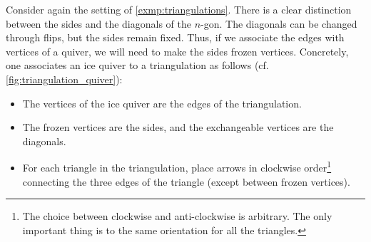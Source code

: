 \begin{example}\label{exmp:triangulations_revisited}

	Consider again the setting of \cref{exmp:triangulations}. There is a clear distinction
	between the sides and the diagonals of the $n$-gon. The diagonals can be changed
	through flips, but the sides remain fixed. Thus, if we associate the edges with
	vertices of a quiver, we will need to make the sides frozen vertices. Concretely, one
	associates an ice quiver to a triangulation as follows (cf.
	\cref{fig:triangulation_quiver}):
	\begin{itemize}
		\item The vertices of the ice quiver are the edges of the triangulation.
		\item The frozen vertices are the sides, and the exchangeable vertices are the diagonals.
		\item For each triangle in the triangulation, place arrows in clockwise order\footnote{The
			      choice between clockwise and anti-clockwise is arbitrary. The only important thing is
			      to the same orientation for all the triangles.} connecting the three edges of the
		      triangle (except between frozen vertices).
	\end{itemize}

	\begin{figure}[ht!]

		\begin{center}
\end{center}
\end{figure}
\end{example}
